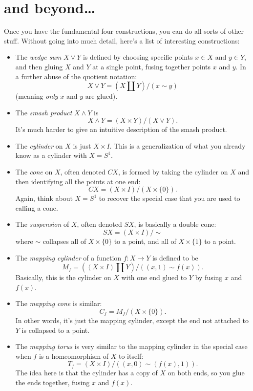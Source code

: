 \documentclass[12pt]{article}
\begin{document}
\section{and beyond\dots}

Once you have the fundamental four constructions, you can do all sorts of other stuff. Without going into much detail, here's a list of interesting constructions:

\begin{itemize}
\item
	The \emph{wedge sum} $X \vee Y$ is defined by choosing specific points $x \in X$ and $y \in Y$, and then gluing $X$ and $Y$ at a single point, fusing together points $x$ and $y$. In a further abuse of the quotient notation:
\[
    X \vee Y = \left(X \amalg Y\right) / (x \sim y)
\]
(meaning \emph{only} $x$ and $y$ are glued).
\item
	The \emph{smash product} $X \wedge Y$ is
\[
	X \wedge Y = \left(X \times Y\right) / \left( X \vee Y\right).
\]
It's much harder to give an intuitive description of the smash product.
\item
	The \emph{cylinder} on $X$ is just $X \times I$. This is a generalization of what you already know as a cylinder with $X = S^{1}$.
\item
	The \emph{cone} on $X$, often denoted $CX$, is formed by taking the cylinder on $X$ and then identifying all the points at one end:
\[
	CX = \left(X \times I\right) / \left(X \times \{0\}\right).
\]
Again, think about $X = S^{1}$ to recover the special case that you are used to calling a cone.
\item
	The \emph{suspension} of $X$, often denoted $SX$, is basically a double cone:
\[
	SX = \left(X \times I\right) / \sim
\]
where $\sim$ collapses all of $X \times \{0\}$ to a point, and all of $X \times \{1\}$ to a point.
\item
	The \emph{mapping cylinder} of a function $f:X \to Y$ is defined to be
\[
	M_{f} = \left(\left(X \times I\right) \amalg Y\right) / \left((x, 1) \sim f(x)\right).     
\]
Basically, this is the cylinder on $X$ with one end glued to $Y$ by fusing $x$ and $f(x)$.
\item
	The \emph{mapping cone} is similar:
\[
	C_{f} = M_{f} / \left(X \times \{0\}\right).
\]
In other words, it's just the mapping cylinder, except the end not attached to $Y$ is collapsed to a point.
\item
	The \emph{mapping torus} is very similar to the mapping cylinder in the special case when $f$ is a homeomorphism of $X$ to itself:
\[
	T_{f} = \left(X \times I\right) / \left( (x, 0) \sim (f(x), 1)\right).
\]
The idea here is that the cylinder has a copy of $X$ on both ends, so you glue the ends together, fusing $x$ and $f(x)$.
\end{itemize}
\end{document}
